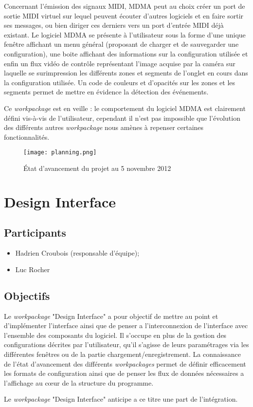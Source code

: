 \par Concernant l'émission des signaux MIDI, MDMA peut au choix créer un port de sortie MIDI virtuel sur lequel peuvent écouter d'autres logiciels et en faire sortir ses messages, ou bien diriger ces derniers vers un port d'entrée MIDI déjà existant.
Le logiciel MDMA se présente à l'utilisateur sous la forme d'une unique fenêtre affichant un menu général (proposant de charger et de sauvegarder une configuration), une boite affichant des informations sur la configuration utilisée et enfin un flux vidéo de contrôle représentant l'image acquise par la caméra sur laquelle se surimpression les différents zones et  segments de l'onglet en cours dans la configuration utilisée. Un code de couleurs et d'opacités sur les zones et les segments permet de mettre en évidence la détection des événements.
\par Ce \emph{workpackage} est en veille : le comportement du logiciel MDMA est clairement défini vis-à-vis de l'utilisateur, cependant il n'est pas impossible que l'évolution des différents autres \emph{workpackage} nous amènes à repenser certaines fonctionnalités.
\begin{figure}
	\centering
	\texttt{[image: planning.png]}
    \caption{État d'avancement du projet au 5 novembre 2012}
\end{figure}



\section{Design Interface}
\subsection{Participants}
\begin{itemize}
    \item Hadrien Croubois (responsable d'équipe);
    \item Luc Rocher
\end{itemize}
\subsection{Objectifs}
\par Le \emph{workpackage} "Design Interface" a pour objectif de mettre au point et d'implémenter l'interface ainsi que de penser a l'interconnexion de l'interface avec l'ensemble des composants du logiciel. Il s'occupe en plus de la gestion des configurations décrites par l'utilisateur, qu'il s'agisse de leurs paramétrages via les différentes fenêtres ou de la partie chargement/enregistrement. La connaissance de l'état d'avancement des différents \emph{workpackages} permet de définir efficacement les formats de configuration ainsi que de penser les flux de données nécessaires a l'affichage au cœur de la structure du programme.
\par Le \emph{workpackage} "Design Interface" anticipe a ce titre une part de l'intégration.
